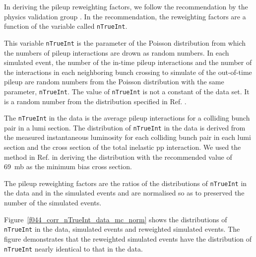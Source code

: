 In deriving the pileup reweighting factors, we follow the
recommendation by the physics validation group
\cite{twiki-PdmVPileUpDescription, twiki-PileupJSONFileforData}. In
the recommendation, the reweighting factors are a function of the
variable called \verb!nTrueInt!.

This variable \verb!nTrueInt! is the parameter of the Poisson
distribution from which the numbers of pileup interactions are drown
as random numbers. In each simulated event, the number of the in-time
pileup interactions and the number of the interactions in each
neighboring bunch crossing to simulate of the out-of-time pileup are
random numbers from the Poisson distribution with the same parameter,
\verb!nTrueInt!. The value of \verb!nTrueInt! is not a constant of the
data set. It is a random number from the distribution specified in
Ref. \cite{github-mix_2015_25ns_Startup_PoissonOOTPU_cfi}.

The \verb!nTrueInt! in the data is the average pileup interactions for
a colliding bunch pair in a lumi section. The distribution of
\verb!nTrueInt! in the data is derived from the measured instantaneous
luminosity for each colliding bunch pair in each lumi section and the
cross section of the total inelastic pp interaction. We used the
method in Ref. \cite{twiki-PileupJSONFileforData} in deriving the
distribution with the recommended value of 69~mb as the minimum bias
cross section.

The pileup reweighting factors are the ratios of the distributions of
\verb!nTrueInt! in the data and in the simulated events and are
normalised so as to preserved the number of the simulated events.

Figure~\ref{f044_corr_nTrueInt_data_mc_norm} shows the distributions
of \verb!nTrueInt! in the data, simulated events and reweighted
simulated events. The figure demonstrates that the reweighted
simulated events have the distribution of \verb!nTrueInt! nearly
identical to that in the data.

